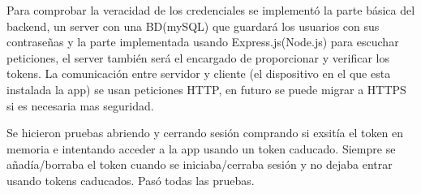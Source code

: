 Para comprobar la veracidad de los credenciales se implementó la parte básica del backend, un server con una BD(mySQL) que guardará los usuarios con sus contraseñas y la parte implementada usando Express.js(Node.js) para escuchar peticiones, el server también será el encargado de proporcionar y verificar los tokens. La comunicación entre servidor y cliente (el dispositivo en el que esta instalada la app) se usan peticiones HTTP, en futuro se puede migrar a HTTPS si es necesaria mas seguridad.

Se hicieron pruebas abriendo y cerrando sesión comprando si exsitía el token en memoria e intentando acceder a la app usando un token caducado. Siempre se añadía/borraba el token cuando se iniciaba/cerraba sesión y no dejaba entrar usando tokens caducados. Pasó todas las pruebas.


